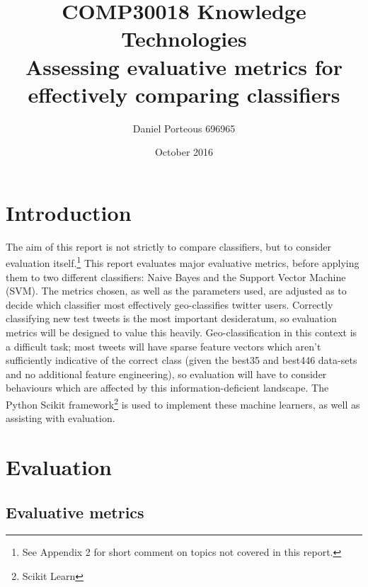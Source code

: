 \documentclass[twocolumn]{article}
\title{COMP30018 Knowledge Technologies \\ \large Assessing evaluative metrics for effectively comparing classifiers}
\author{Daniel Porteous 696965}
\date{October 2016}
\begin{document}
\maketitle

\section{Introduction}
The aim of this report is not strictly to compare classifiers, but to consider evaluation itself.\footnote{See Appendix 2 for short comment on topics not covered in this report.} This report evaluates major evaluative metrics, before applying them to two different classifiers: Naive Bayes and the Support Vector Machine (SVM). The metrics chosen, as well as the parameters used, are adjusted as to decide which classifier most effectively geo-classifies twitter users. Correctly classifying new test tweets is the most important desideratum, so evaluation metrics will be designed to value this heavily. Geo-classification in this context is a difficult task; most tweets will have sparse feature vectors which aren't sufficiently indicative of the correct class (given the best35 and best446 data-sets and no additional feature engineering), so evaluation will have to consider behaviours which are affected by this information-deficient landscape. The Python Scikit framework\footnote{\cite{scikit-learn} Scikit Learn} is used to implement these machine learners, as well as assisting with evaluation.

\section{Evaluation}
\subsection{Evaluative metrics}
\end{document}
